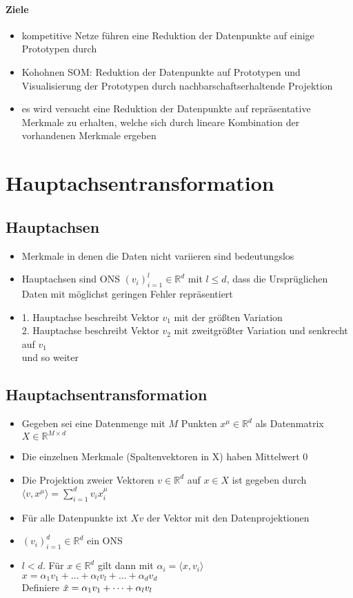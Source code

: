 \paragraph{Ziele}
\begin{itemize}
    \item kompetitive Netze führen eine Reduktion der Datenpunkte auf einige Prototypen durch 
    \item Kohohnen SOM: Reduktion der Datenpunkte auf Prototypen und Visualisierung der Prototypen durch nachbarschaftserhaltende Projektion 
    \item es wird versucht eine Reduktion der Datenpunkte auf repräsentative Merkmale zu erhalten, welche sich durch lineare Kombination der vorhandenen Merkmale ergeben
\end{itemize}

\section{Hauptachsentransformation}
\subsection{Hauptachsen}
\begin{itemize}
    \item Merkmale in denen die Daten nicht variieren sind bedeutungslos 
    \item Hauptachsen sind ONS $(v_i)_{i=1}^l\in\mathbb{R}^d$ mit $l\leq d$, dass die Ursprüglichen Daten mit möglichst geringen Fehler repräsentiert
    \item 1. Hauptachse beschreibt Vektor $v_1$ mit der größten Variation\\
        2. Hauptachse beschreibt Vektor $v_2$ mit zweitgrößter Variation und senkrecht auf $v_1$\\
        und so weiter
\end{itemize}

\subsection{Hauptachsentransformation}
\begin{itemize}
    \item Gegeben sei eine Datenmenge mit $M$ Punkten $x^\mu\in\mathbb{R}^d$ als Datenmatrix $X\in\mathbb{R}^{M\times d}$
    \item Die einzelnen Merkmale (Spaltenvektoren in X) haben Mittelwert 0
    \item Die Projektion zweier Vektoren $v\in\mathbb{R}^d$ auf $x \in X$ ist gegeben durch $\langle v,x^\mu \rangle = \sum_{i=1}^dv_ix_i^\mu $
    \item Für alle Datenpunkte ixt $Xv$ der Vektor mit den Datenprojektionen
    \item $(v_i)_{i=1}^d\in\mathbb{R}^d$ ein ONS
    \item $l<d$. Für $x\in\mathbb{R}^d$ gilt dann mit $\alpha_i = \langle x,v_i \rangle$\\ 
        $x = \alpha_1v_1 + \dots + \alpha_lv_l + \dots +\alpha_dv_d$\\
        Definiere $\Tilde{x} = \alpha_1v_1 + \dots + \alpha_lv_l$
\end{itemize}

